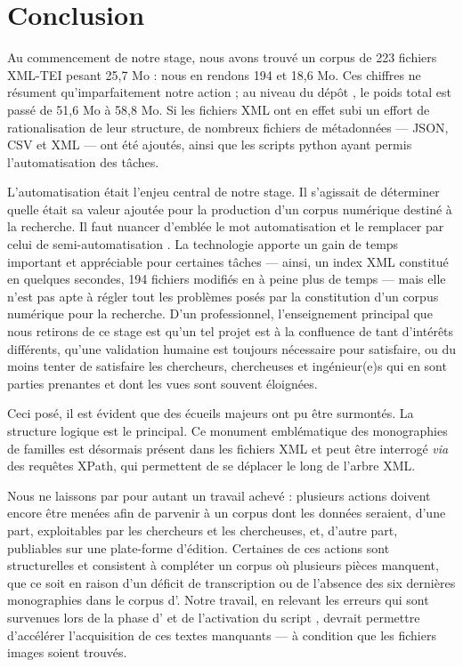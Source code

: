\part*{Conclusion}


Au commencement de notre stage, nous avons trouvé un corpus de 223 fichiers XML-TEI pesant 25,7 Mo : nous en rendons 194 et 18,6 Mo. Ces chiffres ne résument qu'imparfaitement notre action ; au niveau du dépôt \gitlab, le poids total est passé de 51,6 Mo à 58,8 Mo. Si les fichiers XML ont en effet subi un effort de rationalisation de leur structure, de nombreux fichiers de métadonnées --- JSON, CSV et XML --- ont été ajoutés, ainsi que les scripts python ayant permis l'automatisation des tâches.

L'automatisation était l'enjeu central de notre stage. Il s'agissait de déterminer quelle était sa valeur ajoutée pour la production d'un corpus numérique destiné à la recherche. Il faut nuancer d'emblée le mot \og automatisation \fg{} et le remplacer par celui de \og semi-automatisation \fg{}. La technologie apporte un gain de temps important et appréciable pour certaines tâches --- ainsi, un index XML constitué en quelques secondes, 194 fichiers modifiés en à peine plus de temps --- mais elle n'est pas apte à régler tout les problèmes posés par la constitution d'un corpus numérique pour la recherche.  D'un \pov{} professionnel, l'enseignement principal que nous retirons de ce stage est qu'un tel projet est à la confluence de tant d'intérêts différents, qu'une validation humaine est toujours nécessaire pour satisfaire, ou du moins tenter de satisfaire les chercheurs, chercheuses et ingénieur(e)s qui en sont parties prenantes et dont les vues sont souvent éloignées.

Ceci posé, il est évident que des écueils majeurs ont pu être surmontés. La structure logique est le principal. Ce monument emblématique des monographies de familles est désormais présent dans les fichiers XML et peut être interrogé \textit{via} des requêtes XPath, qui permettent de se déplacer le long de l'arbre XML.

Nous ne laissons par pour autant un travail achevé : plusieurs actions doivent encore être menées afin de parvenir à un corpus dont les données seraient, d'une part, exploitables par les chercheurs et les chercheuses, et, d'autre part, publiables sur une plate-forme d'édition. Certaines de ces actions sont structurelles et consistent à compléter un corpus où plusieurs pièces manquent, que ce soit en raison d'un déficit de transcription ou de l'absence des six dernières monographies dans le corpus d'\ia. Notre travail, en relevant les erreurs qui sont survenues lors de la phase d'\ocr{} et de l'activation du script \lse, devrait permettre d'accélérer l'acquisition de ces textes manquants --- à condition que les fichiers images soient trouvés.

